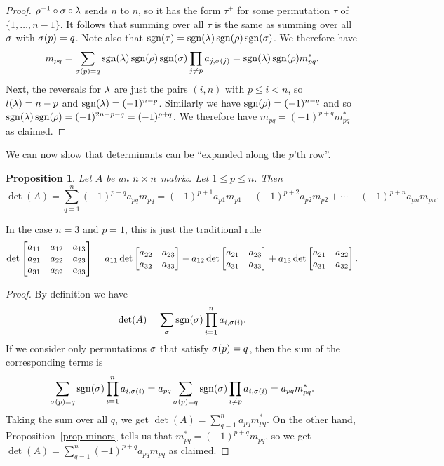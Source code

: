\documentclass[reqno]{amsart}
\newtheorem{proposition}[theorem]{Proposition}
\theoremstyle{definition}
\begin{document}
\begin{proof}
 $\rho^{-1}\circ\sigma\circ\lambda$ sends $n$ to $n$, so it has the form
 $\tau^+$ for some permutation $\tau$ of $\{1,\dotsc,n-1\}$.  It follows
 that summing over all $\tau$ is the same as summing over all $\sigma$
 with $\sigma(p)=q$.  Note also that
 $\operatorname{sgn}(\tau)=\operatorname{sgn}(\lambda)\operatorname{sgn}(\rho)\operatorname{sgn}(\sigma)$.  We therefore have
 \[ m_{pq}
     = \sum_{\sigma(p)=q} \operatorname{sgn}(\lambda)\operatorname{sgn}(\rho)\operatorname{sgn}(\sigma)
        \prod_{j\neq p} a_{j,\sigma(j)}
     = \operatorname{sgn}(\lambda)\operatorname{sgn}(\rho) m^*_{pq}.
 \]
 Next, the reversals for $\lambda$ are just the pairs $(i,n)$ with $p\leq
 i<n$, so $l(\lambda)=n-p$ and $\operatorname{sgn}(\lambda)=(-1)^{n-p}$.  Similarly we have
 $\operatorname{sgn}(\rho)=(-1)^{n-q}$ and so
 $\operatorname{sgn}(\lambda)\operatorname{sgn}(\rho)=(-1)^{2n-p-q}=(-1)^{p+q}$.  We therefore have
 $m_{pq}=(-1)^{p+q}m^*_{pq}$ as claimed.
\end{proof}

We can now show that determinants can be ``expanded along the $p$'th
row''.

\begin{proposition}\label{prop-det-expand}
 Let $A$ be an $n\times n$ matrix.  Let $1 \leq p \leq n$.
 Then
 \[ \det(A) = \sum_{q=1}^n (-1)^{p+q}a_{pq}m_{pq} =
     (-1)^{p+1} a_{p1} m_{p1} + (-1)^{p+2} a_{p2}m_{p2} + \dotsb + (-1)^{p+n} a_{pn}m_{pn}.
 \]
\end{proposition}

In the case $n=3$ and $p=1$, this is just the traditional rule
\[ \det\left[\begin{matrix} a_{11} & a_{12} & a_{13} \\
            a_{21} & a_{22} & a_{23} \\
            a_{31} & a_{32} & a_{33} \end{matrix}\right] =
     a_{11} \det\left[\begin{matrix} a_{22} & a_{23} \\ a_{32} & a_{33} \end{matrix}\right]
    -a_{12} \det\left[\begin{matrix} a_{21} & a_{23} \\ a_{31} & a_{33} \end{matrix}\right]
    +a_{13} \det\left[\begin{matrix} a_{21} & a_{22} \\ a_{31} & a_{32} \end{matrix}\right].
\]

\begin{proof}
 By definition we have
 \[ \det(A) = \sum_\sigma \operatorname{sgn}(\sigma)\prod_{i=1}^n a_{i,\sigma(i)}. \]
 If we consider only permutations $\sigma$ that satisfy $\sigma(p)=q$, then
 the sum of the corresponding terms is
 \[ \sum_{\sigma(p)=q} \operatorname{sgn}(\sigma)\prod_{i=1}^n a_{i,\sigma(i)}
     = a_{pq} \sum_{\sigma(p)=q} \operatorname{sgn}(\sigma)\prod_{i\neq p} a_{i,\sigma(i)}
     = a_{pq} m^*_{pq}.
 \]
 Taking the sum over all $q$, we get
 $\det(A)=\sum_{q=1}^n a_{pq}m^*_{pq}$.  On the other hand,
 Proposition~\ref{prop-minors} tells us that
 $m^*_{pq}=(-1)^{p+q}m_{pq}$, so we get
 $\det(A)=\sum_{q=1}^n (-1)^{p+q}a_{pq}m_{pq}$ as claimed.
\end{proof}
\end{document}
